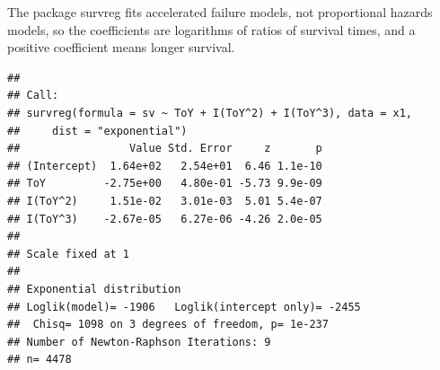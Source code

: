 \documentclass[12pt,]{book}
\newenvironment{Shaded}{\begin{snugshade}}{\end{snugshade}}
\newcommand{\ControlFlowTok}[1]{\textcolor[rgb]{0.13,0.29,0.53}{\textbf{#1}}}
\newcommand{\DataTypeTok}[1]{\textcolor[rgb]{0.13,0.29,0.53}{#1}}
\newcommand{\DecValTok}[1]{\textcolor[rgb]{0.00,0.00,0.81}{#1}}
\newcommand{\KeywordTok}[1]{\textcolor[rgb]{0.13,0.29,0.53}{\textbf{#1}}}
\newcommand{\NormalTok}[1]{#1}
\newcommand{\OperatorTok}[1]{\textcolor[rgb]{0.81,0.36,0.00}{\textbf{#1}}}
\newcommand{\StringTok}[1]{\textcolor[rgb]{0.31,0.60,0.02}{#1}}
\begin{document}
\begin{Shaded}
\end{Shaded}

The package survreg fits accelerated failure models, not proportional
hazards models, so the coefficients are logarithms of ratios of
survival times, and a positive coefficient means longer survival.

\begin{Shaded}
\end{Shaded}

\begin{verbatim}
## 
## Call:
## survreg(formula = sv ~ ToY + I(ToY^2) + I(ToY^3), data = x1, 
##     dist = "exponential")
##                 Value Std. Error     z       p
## (Intercept)  1.64e+02   2.54e+01  6.46 1.1e-10
## ToY         -2.75e+00   4.80e-01 -5.73 9.9e-09
## I(ToY^2)     1.51e-02   3.01e-03  5.01 5.4e-07
## I(ToY^3)    -2.67e-05   6.27e-06 -4.26 2.0e-05
## 
## Scale fixed at 1 
## 
## Exponential distribution
## Loglik(model)= -1906   Loglik(intercept only)= -2455
##  Chisq= 1098 on 3 degrees of freedom, p= 1e-237 
## Number of Newton-Raphson Iterations: 9 
## n= 4478
\end{verbatim}
\end{document}
